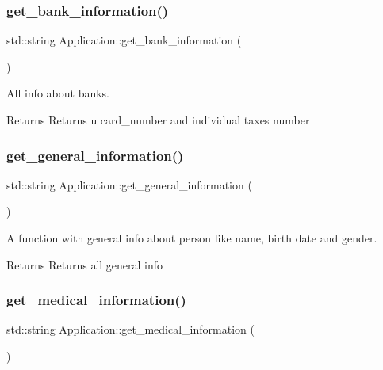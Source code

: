 \subsubsection{\texorpdfstring{get\+\_\+bank\+\_\+information()}{get\_bank\_information()}}
{\footnotesize\ttfamily std\+::string Application\+::get\+\_\+bank\+\_\+information (\begin{DoxyParamCaption}{ }\end{DoxyParamCaption})\hspace{0.3cm}{\ttfamily [inline]}}



All info about banks. 

\begin{DoxyReturn}{Returns}
Returns u card\+\_\+number and individual taxes number 
\end{DoxyReturn}
\mbox{\label{classApplication_a5e74a6dd312571caae7ad5009ed80864}} 
\subsubsection{\texorpdfstring{get\+\_\+general\+\_\+information()}{get\_general\_information()}}
{\footnotesize\ttfamily std\+::string Application\+::get\+\_\+general\+\_\+information (\begin{DoxyParamCaption}{ }\end{DoxyParamCaption})\hspace{0.3cm}{\ttfamily [inline]}}



A function with general info about person like name, birth date and gender. 

\begin{DoxyReturn}{Returns}
Returns all general info 
\end{DoxyReturn}
\mbox{\label{classApplication_ade6d895ba440d17e12b21baf93bc8312}} 
\subsubsection{\texorpdfstring{get\+\_\+medical\+\_\+information()}{get\_medical\_information()}}
{\footnotesize\ttfamily std\+::string Application\+::get\+\_\+medical\+\_\+information (\begin{DoxyParamCaption}{ }\end{DoxyParamCaption})\hspace{0.3cm}{\ttfamily [inline]}}



